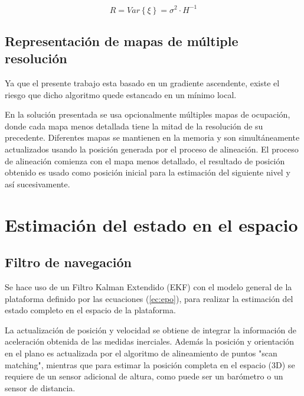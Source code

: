 \documentclass[10pt,a4paper]{article}
\begin{document}
\begin{equation}
\label{eq:RbyH}
	R = Var \left\{ \xi \right\} = \sigma^2 \cdot H^{-1}
\end{equation}

\subsection{Representación de mapas de múltiple resolución}

Ya que el presente trabajo esta basado en un gradiente ascendente, existe el riesgo que dicho algoritmo quede estancado en un mínimo local.

En la solución presentada se usa opcionalmente  múltiples mapas de ocupación, donde cada mapa menos detallada tiene la mitad de la resolución de su precedente. Diferentes mapas se mantienen en la memoria y son simultáneamente actualizados usando la posición generada por el proceso de alineación. El proceso de alineación comienza con el mapa menos detallado, el resultado de posición obtenido es usado como posición inicial para la estimación del siguiente nivel y así sucesivamente.








\section{Estimación del estado en el espacio}

\subsection{Filtro de navegación}

Se hace uso de un Filtro Kalman Extendido (EKF) con el modelo general de la plataforma definido por las ecuaciones (\ref{ec:epo}), para realizar la estimación del estado completo en el espacio de la plataforma.

La actualización de posición y velocidad se obtiene de integrar la información de aceleración obtenida de las medidas inerciales. Además la posición y orientación en el plano es actualizada por el algoritmo de alineamiento de puntos "scan matching", mientras que para estimar la posición completa en el espacio (3D) se requiere de un sensor adicional de altura, como puede ser un barómetro o un sensor de distancia.
\end{document}
